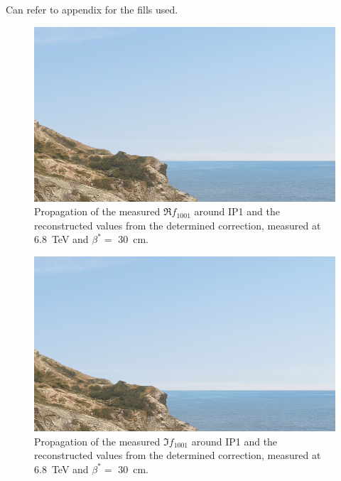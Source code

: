 Can refer to appendix  for the fills used.

\begin{figure}[!htb]
    \centering
    \includegraphics*[width=\columnwidth]{Figures/placeholder.png}
    \caption{Propagation of the measured \(\Re f_{1001}\) around IP1 and the reconstructed values from the determined correction, measured at \qty{6.8}{\tera\electronvolt} and \(\beta^{*}=\) \qty{30}{\centi\meter}.}
    \label{fig:commissioning_sbs_real_f1001_ip1}
\end{figure}

\begin{figure}[!htb]
    \centering
    \includegraphics*[width=\columnwidth]{Figures/placeholder.png}
    \caption{Propagation of the measured \(\Im f_{1001}\) around IP1 and the reconstructed values from the determined correction, measured at \qty{6.8}{\tera\electronvolt} and \(\beta^{*}=\) \qty{30}{\centi\meter}.}
    \label{fig:commissioning_sbs_imag_f1001_ip1}
\end{figure}

